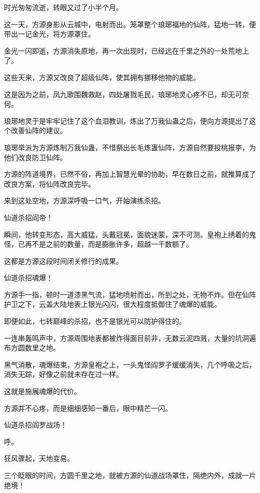 
\begin{this_body}

时光匆匆流逝，转眼又过了小半个月。

这一天，方源身影从云城中，电射而出。笼罩整个琅琊福地的仙阵，猛地一转，便带出一记金光，将方源罩住。

金光一闪即逝，方源消失原地，再一次出现时，已经远在千里之外的一处荒地上了。

这些天来，方源又改良了超级仙阵，使其拥有挪移他物的威能。

这是因为之前，凤九歌围魏救赵，四处屠戮毛民，琅琊地灵心疼不已，却无可奈何。

琅琊地灵于是牢牢记住了这个血泪教训，炼出了万我仙蛊之后，便向方源提出了这个改善仙阵的建议。

琅琊举派为方源炼制万我仙蛊，不惜祭出长毛炼蛊仙阵，方源自然要投桃报李，为他们改良防卫仙阵。

方源的阵道境界，已然不俗，再加上智慧光晕的协助，早在数日之前，就推算成了改良方案，将仙阵改良完毕。

来到这处空地，方源深呼吸一口气，开始演练杀招。

仙道杀招阎帝！

瞬间，他转变形态，高大威猛，头戴冠冕，面貌迷蒙，深不可测。皇袍上绣着的鬼怪，已再不是之前的数量，而是膨胀许多，超越一千数额了。

这都是方源这段时间闭关修行的成果。

仙道杀招魂爆！

方源手一指，顿时一道漆黑气流，猛地喷射而出，所到之处，无物不炸。但在仙阵护卫之下，云盖大陆地表上银光闪闪，很大程度抵御住了魂爆的威能。

即便如此，七转巅峰的杀招，也不是银光可以防护得住的。

一连串轰鸣声中，方源周围地表都被炸得面目前非，无数云泥四溅，大量的坑洞遍布方圆数里之地。

黑气消散，魂爆结束，方源皇袍之上，一头鬼怪阎罗子缓缓消失，几个呼吸之后，消失无踪，好像之前就未存在过一样。

这就是施展魂爆的代价。

方源并不心疼，而是细细感知一番后，眼中精芒一闪。

仙道杀招阎罗战场！

呼。

狂风骤起，天地变易。

三个眨眼的时间，方圆千里之地，就被方源的仙道战场罩住，隔绝内外，成就一片绝境！


\end{this_body}

